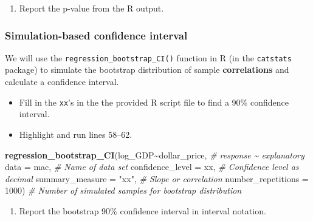 \documentclass[
]{report}
\newenvironment{Shaded}{\begin{snugshade}}{\end{snugshade}}
\newcommand{\AttributeTok}[1]{\textcolor[rgb]{0.13,0.29,0.53}{#1}}
\newcommand{\CommentTok}[1]{\textcolor[rgb]{0.56,0.35,0.01}{\textit{#1}}}
\newcommand{\DecValTok}[1]{\textcolor[rgb]{0.00,0.00,0.81}{#1}}
\newcommand{\FunctionTok}[1]{\textcolor[rgb]{0.13,0.29,0.53}{\textbf{#1}}}
\newcommand{\NormalTok}[1]{#1}
\newcommand{\SpecialCharTok}[1]{\textcolor[rgb]{0.81,0.36,0.00}{\textbf{#1}}}
\newcommand{\StringTok}[1]{\textcolor[rgb]{0.31,0.60,0.02}{#1}}
\providecommand{\tightlist}{%
  \setlength{\itemsep}{0pt}\setlength{\parskip}{0pt}}
\begin{document}
\begin{enumerate}
\def\labelenumi{\arabic{enumi}.}
\setcounter{enumi}{9}
\tightlist
\item
  Report the p-value from the R output.
  \vspace{0.3in}
\end{enumerate}

\newpage

\hypertarget{simulation-based-confidence-interval-1}{%
\subsubsection*{Simulation-based confidence interval}\label{simulation-based-confidence-interval-1}}

We will use the \texttt{regression\_bootstrap\_CI()} function in R (in the \texttt{catstats} package) to simulate the bootstrap distribution of sample \textbf{correlations} and calculate a confidence interval.

\begin{itemize}
\item
  Fill in the \texttt{xx}'s in the the provided R script file to find a 90\% confidence interval.
\item
  Highlight and run lines 58--62.
\end{itemize}

\begin{Shaded}
\begin{Highlighting}[]
\FunctionTok{regression\_bootstrap\_CI}\NormalTok{(log\_GDP}\SpecialCharTok{\textasciitilde{}}\NormalTok{dollar\_price, }\CommentTok{\# response \textasciitilde{} explanatory}
   \AttributeTok{data =}\NormalTok{ mac, }\CommentTok{\# Name of data set}
   \AttributeTok{confidence\_level =}\NormalTok{ xx, }\CommentTok{\# Confidence level as decimal}
   \AttributeTok{summary\_measure =} \StringTok{"xx"}\NormalTok{, }\CommentTok{\# Slope or correlation}
   \AttributeTok{number\_repetitions =} \DecValTok{1000}\NormalTok{) }\CommentTok{\# Number of simulated samples for bootstrap distribution}
\end{Highlighting}
\end{Shaded}

\begin{enumerate}
\def\labelenumi{\arabic{enumi}.}
\setcounter{enumi}{10}
\tightlist
\item
  Report the bootstrap 90\% confidence interval in interval notation.\\
  \vspace{0.5in}
\end{enumerate}
\end{document}
